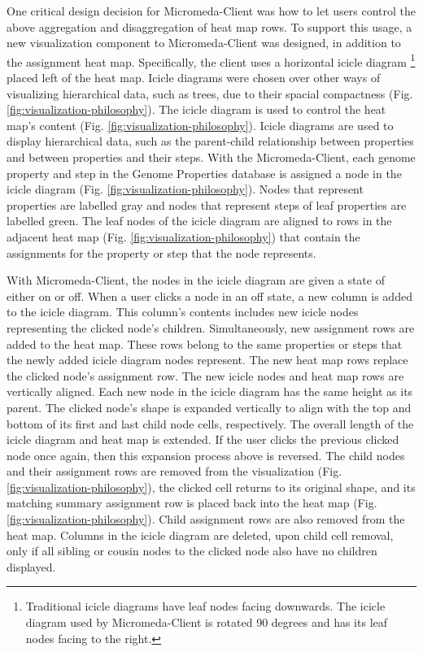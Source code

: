 One critical design decision for Micromeda-Client was how to let users control the above aggregation and disaggregation of heat map rows. To support this usage, a new visualization component to Micromeda-Client was designed, in addition to the assignment heat map. Specifically, the client uses a horizontal icicle diagram \footnote{Traditional icicle diagrams have leaf nodes facing downwards. The icicle diagram used by Micromeda-Client is rotated 90 degrees and has its leaf nodes facing to the right.} placed left of the heat map. Icicle diagrams were chosen over other ways of visualizing hierarchical data, such as trees, due to their spacial compactness (Fig. \ref{fig:visualization-philosophy}). The icicle diagram is used to control the heat map's content (Fig. \ref{fig:visualization-philosophy}). Icicle diagrams are used to display hierarchical data, such as the parent-child relationship between properties and between properties and their steps. With the Micromeda-Client, each genome property and step in the Genome Properties database is assigned a node in the icicle diagram (Fig. \ref{fig:visualization-philosophy}). Nodes that represent properties are labelled gray and nodes that represent steps of leaf properties are labelled green. The leaf nodes of the icicle diagram are aligned to rows in the adjacent heat map (Fig. \ref{fig:visualization-philosophy}) that contain the assignments for the property or step that the node represents.

With Micromeda-Client, the nodes in the icicle diagram are given a state of either on or off. When a user clicks a node in an off state, a new column is added to the icicle diagram. This column's contents includes new icicle nodes representing the clicked node's children. Simultaneously, new assignment rows are added to the heat map. These rows belong to the same properties or steps that the newly added icicle diagram nodes represent. The new heat map rows replace the clicked node's assignment row. The new icicle nodes and heat map rows are vertically aligned. Each new node in the icicle diagram has the same height as its parent. The clicked node's shape is expanded vertically to align with the top and bottom of its first and last child node cells, respectively. The overall length of the icicle diagram and heat map is extended. If the user clicks the previous clicked node once again, then this expansion process above is reversed. The child nodes and their assignment rows are removed from the visualization (Fig. \ref{fig:visualization-philosophy}), the clicked cell returns to its original shape, and its matching summary assignment row is placed back into the heat map (Fig. \ref{fig:visualization-philosophy}). Child assignment rows are also removed from the heat map. Columns in the icicle diagram are deleted, upon child cell removal, only if all sibling or cousin nodes to the clicked node also have no children displayed.

